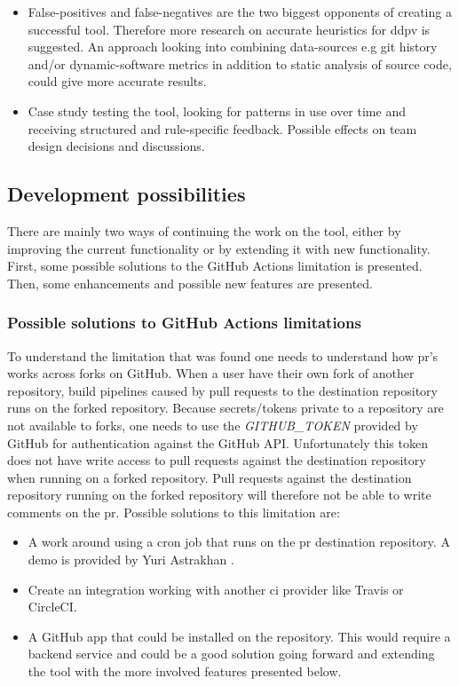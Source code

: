 \documentclass[pdftex,10pt,b5paper,twoside]{report}
\begin{document}
\begin{itemize}
    \item False-positives and false-negatives are the two biggest opponents of creating a successful tool. Therefore more research on accurate heuristics for \gls{ddpv} is suggested. An approach looking into combining data-sources e.g git history and/or dynamic-software metrics in addition to static analysis of source code, could give more accurate results. 
    
    \item Case study testing the tool, looking for patterns in use over time and receiving structured and rule-specific feedback. Possible effects on team design decisions and discussions.   
\end{itemize}


\subsection*{Development possibilities}
There are mainly two ways of continuing the work on the tool, either by improving the current functionality or by extending it with new functionality. First, some possible solutions to the GitHub Actions limitation is presented. Then, some enhancements and possible new features are presented.


\subsubsection{Possible solutions to GitHub Actions limitations}

\label{possible-solutions}
To understand the limitation that was found one needs to understand how \gls{pr}'s works across forks on GitHub. When a user have their own fork of another repository, build pipelines caused by pull requests to the destination repository runs on the forked repository. Because secrets/tokens private to a repository are not available to forks, one needs to use the \textit{GITHUB\_TOKEN} provided by GitHub for authentication against the GitHub API. Unfortunately this token does not have write access to pull requests against the destination repository when running on a forked repository. Pull requests against the destination repository running on the forked repository will therefore not be able to write comments on the \gls{pr}. Possible solutions to this limitation are: 
\begin{itemize}
    \item A work around using a cron job that runs on the \gls{pr} destination repository. A demo is provided by Yuri Astrakhan \cite{workaround-demo}. 
    
    \item Create an integration working with another \gls{ci} provider like Travis or CircleCI. 
    
    \item A GitHub app that could be installed on the repository. This would require a backend service and could be a good solution going forward and extending the tool with the more involved features presented below.
\end{itemize}
\end{document}
